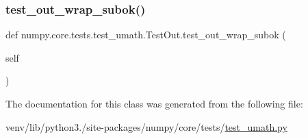 \subsubsection{\texorpdfstring{test\+\_\+out\+\_\+wrap\+\_\+subok()}{test\_out\_wrap\_subok()}}
{\footnotesize\ttfamily def numpy.\+core.\+tests.\+test\+\_\+umath.\+Test\+Out.\+test\+\_\+out\+\_\+wrap\+\_\+subok (\begin{DoxyParamCaption}\item[{}]{self }\end{DoxyParamCaption})}



The documentation for this class was generated from the following file\+:\begin{DoxyCompactItemize}
\item 
venv/lib/python3./site-\/packages/numpy/core/tests/\hyperlink{test__umath_8py}{test\+\_\+umath.\+py}\end{DoxyCompactItemize}
